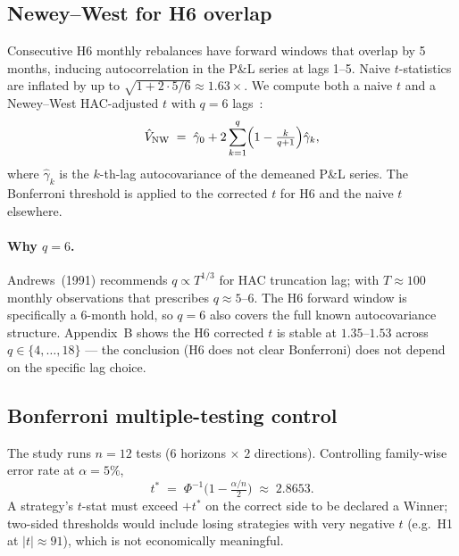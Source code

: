 \documentclass[10pt,conference,compsoc]{IEEEtran}
\begin{document}
\subsection{Newey--West for H6 overlap}
\label{sec:nw}

Consecutive H6 monthly rebalances have forward windows that overlap
by 5 months, inducing autocorrelation in the P\&L series at lags
1--5. Naive $t$-statistics are inflated by up to $\sqrt{1+2\cdot
5/6}\approx 1.63\times$. We compute both a naive $t$ and a
Newey--West HAC-adjusted $t$ with $q=6$ lags~\cite{nw1987}:
\begin{equation}
  \hat V_{\text{NW}}
  \;=\; \hat{\gamma}_0 + 2\sum_{k=1}^{q}\Bigl(1-\tfrac{k}{q+1}\Bigr)
         \hat{\gamma}_k,
  \label{eq:nw}
\end{equation}
where $\hat\gamma_k$ is the $k$-th-lag autocovariance of the
demeaned P\&L series. The Bonferroni threshold is applied to the
corrected $t$ for H6 and the naive $t$ elsewhere.

\paragraph{Why $q=6$.} Andrews~(1991) recommends
$q \propto T^{1/3}$ for HAC truncation lag; with $T \approx 100$
monthly observations that prescribes $q \approx 5$--$6$. The H6
forward window is specifically a 6-month hold, so $q=6$ also
covers the full known autocovariance structure. Appendix~B shows
the H6 corrected $t$ is stable at $1.35$--$1.53$ across
$q \in \{4, \ldots, 18\}$ --- the conclusion (H6 does not clear
Bonferroni) does not depend on the specific lag choice.

\subsection{Bonferroni multiple-testing control}

The study runs $n = 12$ tests ($6$ horizons $\times$ $2$ directions).
Controlling family-wise error rate at $\alpha = 5\%$,
\begin{equation}
  t^{*} \;=\; \Phi^{-1}\!\bigl(1 - \tfrac{\alpha/n}{2}\bigr)
  \;\approx\; 2.8653.
  \label{eq:bonf}
\end{equation}
A strategy's $t$-stat must exceed $+t^{*}$ on the correct side to be
declared a Winner; two-sided thresholds would include losing strategies
with very negative $t$ (e.g.\ H1 at $|t|\approx 91$), which is not
economically meaningful.
\end{document}
